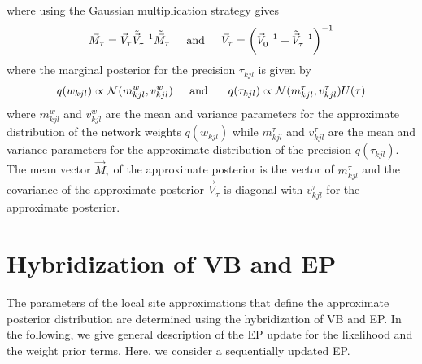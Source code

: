 \documentclass[]{article}
\begin{document}
where using the Gaussian multiplication strategy gives 
\begin{equation}
	\vec{M}_\tau = \vec{V}_\tau\tilde{\vec{V}}^{-1}_\tau \tilde{\vec{M}}_\tau \hspace*{0.2in} \text{and} \hspace*{0.2in} \vec{V}_\tau = \bigg(\vec{V}^{-1}_0 + \tilde{\vec{V}}^{-1}_\tau\bigg)^{-1}
	\label{equ:31}
\end{equation}
where the marginal posterior for the precision $\tau_{kjl}$ is given by 
\begin{equation}
	q(w_{kjl}) \propto \mathcal{N}(m^w_{kjl}, v^{w}_{kjl}) \hspace{0.2in} \text{and } \hspace{0.2in} q(\tau_{kjl}) \propto \mathcal{N}(m^\tau_{kjl}, v^{\tau}_{kjl})U(\tau)
	\label{equ:32}
\end{equation} 
where $m_{kjl}^{w}$ and $v_{kjl}^{w}$ are the mean and variance parameters for the approximate distribution of the network weights $q(w_{kjl})$ while $m_{kjl}^{\tau}$ and $v_{kjl}^{\tau}$ are the mean and variance parameters for the approximate distribution of the precision $q(\tau_{kjl})$. The mean vector $\vec{M}_{\tau}$ of the approximate posterior is the vector of $m_{kjl}^{\tau}$ and the covariance of the approximate posterior $\vec{V}_{\tau}$ is diagonal with $v_{kjl}^{\tau}$ for the approximate posterior.
\section{Hybridization of VB and EP}\label{sec:3.2}
The parameters of the local site approximations that define the approximate posterior distribution are determined using the hybridization of VB and EP. In the following, we give general description of the EP update for the likelihood and the weight prior terms. Here, we consider a sequentially updated EP.
\end{document}
